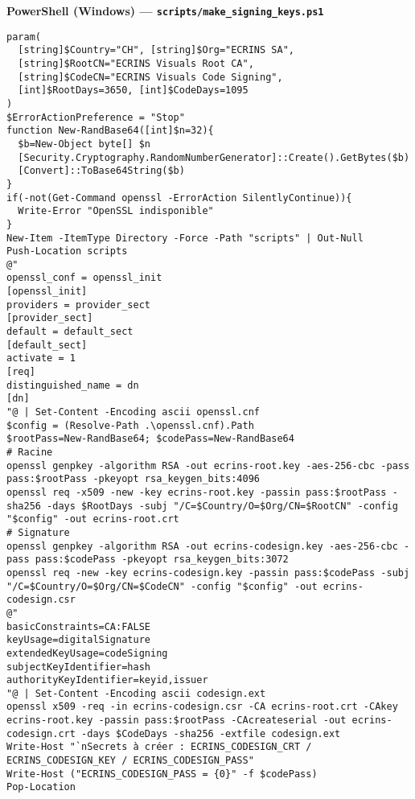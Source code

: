 \textbf{PowerShell (Windows) — \texttt{scripts/make\_signing\_keys.ps1}}
\begin{lstlisting}[basicstyle=\ttfamily\small,breaklines=true,columns=fullflexible]
param(
  [string]$Country="CH", [string]$Org="ECRINS SA",
  [string]$RootCN="ECRINS Visuals Root CA",
  [string]$CodeCN="ECRINS Visuals Code Signing",
  [int]$RootDays=3650, [int]$CodeDays=1095
)
$ErrorActionPreference = "Stop"
function New-RandBase64([int]$n=32){
  $b=New-Object byte[] $n
  [Security.Cryptography.RandomNumberGenerator]::Create().GetBytes($b)
  [Convert]::ToBase64String($b)
}
if(-not(Get-Command openssl -ErrorAction SilentlyContinue)){
  Write-Error "OpenSSL indisponible"
}
New-Item -ItemType Directory -Force -Path "scripts" | Out-Null
Push-Location scripts
@"
openssl_conf = openssl_init
[openssl_init]
providers = provider_sect
[provider_sect]
default = default_sect
[default_sect]
activate = 1
[req]
distinguished_name = dn
[dn]
"@ | Set-Content -Encoding ascii openssl.cnf
$config = (Resolve-Path .\openssl.cnf).Path
$rootPass=New-RandBase64; $codePass=New-RandBase64
# Racine
openssl genpkey -algorithm RSA -out ecrins-root.key -aes-256-cbc -pass pass:$rootPass -pkeyopt rsa_keygen_bits:4096
openssl req -x509 -new -key ecrins-root.key -passin pass:$rootPass -sha256 -days $RootDays -subj "/C=$Country/O=$Org/CN=$RootCN" -config "$config" -out ecrins-root.crt
# Signature
openssl genpkey -algorithm RSA -out ecrins-codesign.key -aes-256-cbc -pass pass:$codePass -pkeyopt rsa_keygen_bits:3072
openssl req -new -key ecrins-codesign.key -passin pass:$codePass -subj "/C=$Country/O=$Org/CN=$CodeCN" -config "$config" -out ecrins-codesign.csr
@"
basicConstraints=CA:FALSE
keyUsage=digitalSignature
extendedKeyUsage=codeSigning
subjectKeyIdentifier=hash
authorityKeyIdentifier=keyid,issuer
"@ | Set-Content -Encoding ascii codesign.ext
openssl x509 -req -in ecrins-codesign.csr -CA ecrins-root.crt -CAkey ecrins-root.key -passin pass:$rootPass -CAcreateserial -out ecrins-codesign.crt -days $CodeDays -sha256 -extfile codesign.ext
Write-Host "`nSecrets à créer : ECRINS_CODESIGN_CRT / ECRINS_CODESIGN_KEY / ECRINS_CODESIGN_PASS"
Write-Host ("ECRINS_CODESIGN_PASS = {0}" -f $codePass)
Pop-Location
\end{lstlisting}

